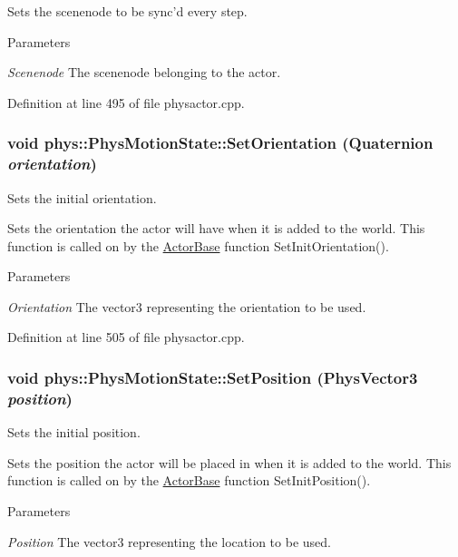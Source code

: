 Sets the scenenode to be sync'd every step. 
\begin{DoxyParams}{Parameters}
\item[{\em Scenenode}]The scenenode belonging to the actor. \end{DoxyParams}


Definition at line 495 of file physactor.cpp.

\hypertarget{classphys_1_1PhysMotionState_ac799070edfea4d1c442e3ed0857bcb1d}{
\subsubsection[{SetOrientation}]{\setlength{\rightskip}{0pt plus 5cm}void phys::PhysMotionState::SetOrientation ({\bf Quaternion} {\em orientation})}}
\label{dc/d0d/classphys_1_1PhysMotionState_ac799070edfea4d1c442e3ed0857bcb1d}


Sets the initial orientation. 

Sets the orientation the actor will have when it is added to the world. This function is called on by the \hyperlink{classphys_1_1ActorBase}{ActorBase} function SetInitOrientation(). 
\begin{DoxyParams}{Parameters}
\item[{\em Orientation}]The vector3 representing the orientation to be used. \end{DoxyParams}


Definition at line 505 of file physactor.cpp.

\hypertarget{classphys_1_1PhysMotionState_a083029e5dbcfafd573d47331ff8660cb}{
\subsubsection[{SetPosition}]{\setlength{\rightskip}{0pt plus 5cm}void phys::PhysMotionState::SetPosition ({\bf PhysVector3} {\em position})}}
\label{dc/d0d/classphys_1_1PhysMotionState_a083029e5dbcfafd573d47331ff8660cb}


Sets the initial position. 

Sets the position the actor will be placed in when it is added to the world. This function is called on by the \hyperlink{classphys_1_1ActorBase}{ActorBase} function SetInitPosition(). 
\begin{DoxyParams}{Parameters}
\item[{\em Position}]The vector3 representing the location to be used. \end{DoxyParams}


